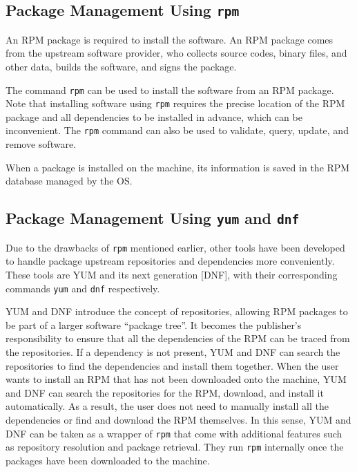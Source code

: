 \subsection{Package Management Using \texttt{rpm}}

An RPM package is required to install the software. An RPM package comes from the upstream software provider, who collects source codes, binary files, and other data, builds the software, and signs the package.

The command \verb|rpm| can be used to install the software from an RPM package. Note that installing software using \verb|rpm| requires the precise location of the RPM package and all dependencies to be installed in advance, which can be inconvenient. The \verb|rpm| command can also be used to validate, query, update, and remove software.

When a package is installed on the machine, its information is saved in the RPM database managed by the OS.

\subsection{Package Management Using \texttt{yum} and \texttt{dnf}}

Due to the drawbacks of \verb|rpm| mentioned earlier, other tools have been developed to handle package upstream repositories and dependencies more conveniently. These tools are YUM and its next generation [DNF], with their corresponding commands \verb|yum| and \verb|dnf| respectively.

YUM and DNF introduce the concept of repositories, allowing RPM packages to be part of a larger software ``package tree''. It becomes the publisher's responsibility to ensure that all the dependencies of the RPM can be traced from the repositories. If a dependency is not present, YUM and DNF can search the repositories to find the dependencies and install them together. When the user wants to install an RPM that has not been downloaded onto the machine, YUM and DNF can search the repositories for the RPM, download, and install it automatically. As a result, the user does not need to manually install all the dependencies or find and download the RPM themselves. In this sense, YUM and DNF can be taken as a wrapper of \verb|rpm| that come with additional features such as repository resolution and package retrieval. They run \verb|rpm| internally once the packages have been downloaded to the machine.

